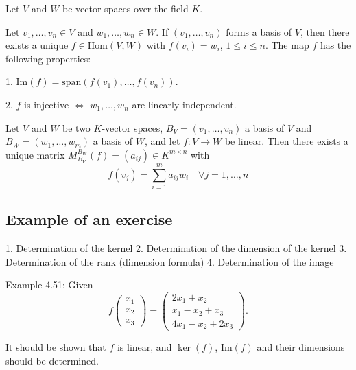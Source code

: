 Let \(V\) and \(W\) be vector spaces over the field \(K\).

 Let \(v_1, \dots, v_n \in V\) and \(w_1, \dots, w_n \in W\). If \((v_1, \dots, v_n)\) forms a basis of \(V\), then there exists a unique \(f \in \text{Hom}(V, W)\) with \(f(v_i) = w_i\), \(1 \leq i \leq n\). The map \(f\) has the following properties:

1.  \(\text{Im}(f) = \text{span}(f(v_1), \dots, f(v_n))\).

2.  \(f\) is injective \(\Leftrightarrow\) \(w_1, \dots, w_n\) are linearly independent.

 Let \(V\) and \(W\) be two \(K\)-vector spaces, \(B_V = (v_1, \dots, v_n)\) a basis of \(V\) and \(B_W = (w_1, \dots, w_m)\) a basis of \(W\), and let \(f : V \rightarrow W\) be linear. Then there exists a unique matrix \(M_{B_V}^{B_W}(f) = (a_{ij}) \in K^{m \times n}\) with
\[
f(v_j) = \sum_{i=1}^{m} a_{ij}w_i \quad \forall j = 1, \dots, n
\]

\subsection{Example of an exercise}

1.  Determination of the kernel
2.  Determination of the dimension of the kernel
3.  Determination of the rank (dimension formula)
4.  Determination of the image

Example 4.51: Given
\[
f\begin{pmatrix}
x_1 \\
x_2 \\
x_3
\end{pmatrix} =
\begin{pmatrix}
2x_1 + x_2 \\
x_1 - x_2 + x_3 \\
4x_1 - x_2 + 2x_3
\end{pmatrix} .
\]

It should be shown that \(f\) is linear, and \(\ker(f)\), \(\text{Im}(f)\) and their dimensions should be determined.

